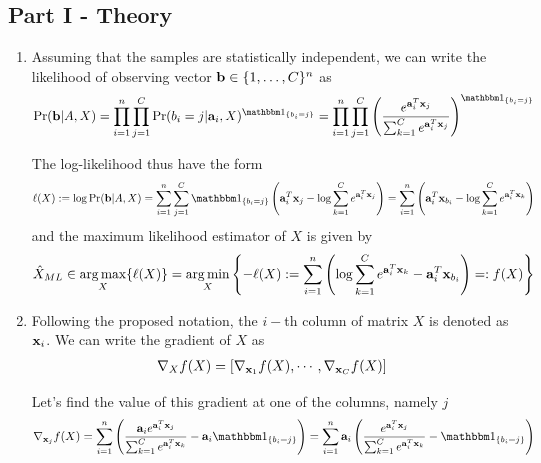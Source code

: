 \documentclass{article}
\begin{document}

\subsection*{Part I - Theory}
\begin{enumerate}[label=1.I.\arabic*]
    \item Assuming that the samples are statistically independent, we can write the likelihood of observing vector $\mathbf{b} \in \{1, \dots, C\}^n$ as
    \begin{align}
        \Pr (\bb | A , X) = \prod_{i=1}^{n} \prod_{j=1}^{C} \Pr (b_i = j | \aa_i, X)^{\ind{b_i = j}} = \prod_{i=1}^{n} \prod_{j=1}^{C} \left( \frac{e^{\aa_i^T \xx_j}}{\sum_{k=1}^{C} e^{\aa_i^T \xx_j}} \right)^{\ind{b_i = j}}
    \end{align}
    
    The log-likelihood thus have the form
    \begin{align}
        \ell(X) := \log \Pr (\bb | A , X) = \sum_{i=1}^{n} \sum_{j=1}^{C} \ind{b_i = j} \left( \aa_i^T \xx_j - \log \sum_{k=1}^{C} e^{\aa_i^T \xx_j} \right) = \sum_{i=1}^{n} \left( \aa_i^T \xx_{b_i} - \log \sum_{k=1}^{C} e^{\aa_i^T \xx_{k}} \right)
    \end{align}
    and the maximum likelihood estimator of $X$ is given by
    \begin{align}
        \hat{X}_{ML} \in \operatorname*{arg\,max}_X \{ \ell(X) \} = \operatorname*{arg\,min}_X \left\lbrace -\ell(X) := \sum_{i=1}^{n} \left( \log \sum_{k=1}^{C} e^{\mathbf{a}_i^T \mathbf{x}_{k}} - \mathbf{a}_i^T \mathbf{x}_{b_i} \right) =: f(X) \right\rbrace
    \end{align}
    
    \item Following the proposed notation, the $i-$th column of matrix $X$ is denoted as $\mathbf{x}_i$. We can write the gradient of $X$ as
    \begin{align}
        \nabla_X f(X) = [\nabla_{\mathbf{x}_1} f(X), \cdots, \nabla_{\mathbf{x}_C} f(X)]
    \end{align}
    
    Let's find the value of this gradient at one of the columns, namely $j$
    \begin{align}
        \nabla_{\xx_j} f(X) = \sum_{i=1}^{n} \left( \frac{\aa_i e^{\aa_i^T \xx_{j}} }{ \sum_{k=1}^{C} e^{\aa_i^T \xx_{k}}} - \aa_i \ind{b_i = j}\right)=\sum_{i=1}^{n}\aa_i  \left( \frac{e^{\aa_i^T \xx_{j}} }{ \sum_{k=1}^{C} e^{\aa_i^T \xx_{k}}} - \ind{b_i = j}\right)
    \end{align}
    

\end{enumerate}
\end{document}
